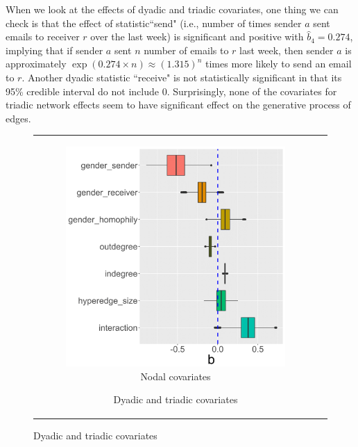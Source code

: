 \documentclass[ba]{imsart}
\numberwithin{equation}{section}
\theoremstyle{plain}
\begin{document}
	When we look at the effects of dyadic and triadic covariates, one thing we can check is that the effect of statistic``send" (i.e., number of times sender $a$ sent emails to receiver $r$ over the last week) is significant and positive with $\hat{b}_4 = 0.274$, implying that if sender $a$ sent $n$ number of emails to $r$ last week, then sender $a$ is approximately $\exp(0.274\times n)\approx(1.315)^n$ times more likely to send an email to $r$. Another dyadic statistic ``receive" is not statistically significant in that its 95\% credible interval do not include 0. Surprisingly, none of the covariates for triadic network effects seem to have significant effect on the generative process of edges.
			\begin{figure}[!t]
				\centering
				\begin{tabular}[t]{cc}
					\begin{subfigure}[b]{0.495\textwidth}
						\caption{Nodal covariates}
						\includegraphics[width=\textwidth]{img/betanewplot2-1.png}	
					\end{subfigure}
					\begin{subfigure}[b]{0.495\textwidth}
						\caption{Dyadic and triadic covariates}

\end{subfigure}
\end{tabular}
\end{figure}
\end{document}
